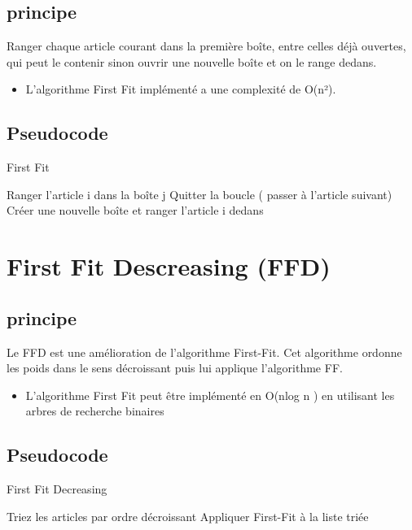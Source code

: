 \documentclass[12pt]{article}
\begin{document}
\subsection{principe}
Ranger chaque article courant dans la première boîte, entre celles déjà ouvertes, qui peut le contenir sinon ouvrir une nouvelle boîte et on le range dedans.
\begin{itemize}
    \item L’algorithme First Fit implémenté a une complexité de O(n²). 
\end{itemize}

\subsection{Pseudocode}
\begin{algorithm}[!h]
    \caption{First Fit}
    \begin{algorithmic}
              \STATE Ranger l’article i dans la boîte j\;
              \STATE Quitter la boucle ( passer à l'article suivant)\;
             \ENDIF 
        \ENDFOR
            \STATE Créer une nouvelle boîte et ranger l’article i dedans\;
        \ENDIF
    \ENDFOR
    \end{algorithmic}
\end{algorithm}

\section{First Fit Descreasing (FFD)}
\subsection{principe}
Le FFD est une amélioration de l’algorithme First-Fit. Cet algorithme ordonne les poids dans le sens décroissant puis lui applique l’algorithme FF.
\begin{itemize}
    \item L’algorithme First Fit peut être implémenté en O(nlog n ) en utilisant les arbres de recherche binaires 
\end{itemize}

\subsection{Pseudocode}
\begin{algorithm}[!h]
    \caption{First Fit Decreasing }
    \begin{algorithmic}
        \STATE Triez les articles par ordre décroissant\;
        \STATE Appliquer First-Fit à la liste triée \;
    \end{algorithmic}
\end{algorithm}
\end{document}
